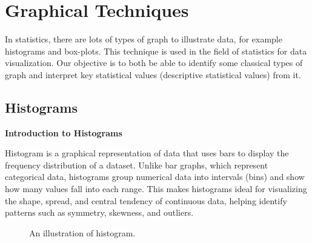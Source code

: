 \section{Graphical Techniques}

In statistics, there are lots of types of graph to illustrate data, for example histograms and box-plots. This technique is used in the field of statistics for data visualization. Our objective is to both be able to identify some classical types of graph and interpret key statistical values (descriptive statistical values) from it.

\subsection{Histograms}

\textbf{Introduction to Histograms}

\noindent
Histogram is a graphical representation of data that uses bars to display the frequency distribution of a dataset. Unlike bar graphs, which represent categorical data, histograms group numerical data into intervals (bins) and show how many values fall into each range. This makes histograms ideal for visualizing the shape, spread, and central tendency of continuous data, helping identify patterns such as symmetry, skewness, and outliers.\\

\begin{figure}[H]
\begin{center}
\end{center}
\caption{An illustration of histogram.}
\end{figure}

